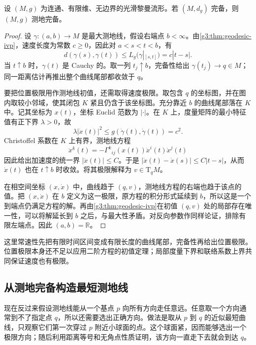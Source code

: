 \begin{proposition}\label{g3:prop:metric-complete-geodesic-extension}
	设 \((M,g)\) 为连通、有限维、无边界的光滑黎曼流形。若 \((M,d_g)\) 完备，则 \((M,g)\) 测地完备。
\end{proposition}
\begin{proof}
	设 \(\gamma:(a,b)\rightarrow M\) 是最大测地线，假设右端点 \(b<\infty\)。由\cref{g3:thm:geodesic-ivp}，速度长度为常数 \(c\ge0\)，因此对 \(a<s<t<b\)，有
	\[
		d(\gamma(s),\gamma(t))\le L_g(\gamma|_{[s,t]})=c|t-s|.
	\]
	当 \(t\uparrow b\) 时，\(\gamma(t)\) 是 Cauchy 的。取一列 \(t_j\uparrow b\)，完备性给出 \(\gamma(t_j)\rightarrow q\in M\)；同一距离估计再推出整个曲线尾部都收敛于 \(q\)。

	要把位置极限用作测地线初值，还需取得速度极限。取包含 \(q\) 的坐标图，并在图内取较小邻域，使其闭包 \(K\) 紧且仍含于该坐标图。充分靠近 \(b\) 的曲线尾部落在 \(K\) 中。记其坐标为 \(x(t)\)，坐标 Euclid 范数为 \(|\cdot|\)。在 \(K\) 上，度量矩阵的最小特征值有正下界 \(\lambda>0\)，故
	\[
		\lambda|\dot x(t)|^2\le g(\dot\gamma(t),\dot\gamma(t))=c^2.
	\]
	Christoffel 系数在 \(K\) 上有界，测地线方程
	\[
		\ddot x^k(t)=-\Gamma^k{}_{ij}(x(t))\dot x^i(t)\dot x^j(t)
	\]
	因此给出加速度的统一界 \(|\ddot x(t)|\le C\)。于是 \(|\dot x(t)-\dot x(s)|\le C|t-s|\)，从而 \(\dot x(t)\) 也在 \(t\uparrow b\) 时收敛。将其极限解释为 \(v\in\mathrm T_qM\)。

	在相空间坐标 \((x,\dot x)\) 中，曲线趋于 \((q,v)\)，测地线方程的右端也趋于该点的值。把 \((x,\dot x)\) 在 \(b\) 定义为这一极限，原方程的积分形式延续到 \(b\)，所以这是一个到端点仍满足方程的解。再由\cref{g3:thm:geodesic-ivp}在初值 \((q,v)\) 处的局部存在唯一性，可以将解延长到 \(b\) 之后，与最大性矛盾。对反向参数作同样论证，排除有限左端点。因此 \((a,b)=\mathbb R\)。
\end{proof}

这里常速性先把有限时间区间变成有限长度的曲线尾部，完备性再给出位置极限。位置极限本身还不足以应用二阶方程的初值定理；局部度量下界和联络系数上界共同保证速度也有极限。

\subsection{从测地完备构造最短测地线}
\label{g3:subsec:0203:02}
现在反过来假设测地线能从一个基点 \(p\) 向所有方向走任意远。任意取一个方向通常到不了指定点 \(q\)，所以还需要选出正确方向。做法是取从 \(p\) 到 \(q\) 的近似最短曲线，只观察它们第一次穿过 \(p\) 附近小球面的点。这个球面紧，因而能够选出一个极限方向；随后利用距离等号和无角点性质证明，该方向一直走下去就会到达 \(q\)。

